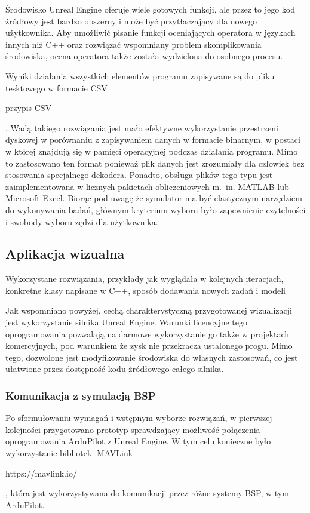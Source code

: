 Środowisko Unreal Engine oferuje wiele gotowych funkcji, ale przez to jego kod źródłowy jest bardzo obszerny i może być przytłaczający dla nowego użytkownika. Aby umożliwić pisanie funkcji oceniających operatora w językach innych niż C++ oraz rozwiązać wspomniany problem skomplikowania środowiska, ocena operatora także została wydzielona do osobnego procesu.

Wyniki działania wszystkich elementów programu zapisywane są do pliku tesktowego w formacie CSV \begin{todo}przypis CSV\end{todo}. Wadą takiego rozwiązania jest mało efektywne wykorzystanie przestrzeni dyskowej w porównaniu z zapisywaniem danych w formacie binarnym, w postaci w której znajdują się w pamięci operacyjnej podczas działania programu. Mimo to zastosowano ten format ponieważ plik danych jest zrozumiały dla człowiek bez stosowania specjalnego dekodera. Ponadto, obsługa plików tego typu jest zaimplementowana w licznych pakietach obliczeniowych m.~in. MATLAB lub Microsoft Excel. Biorąc pod uwagę że symulator ma być elastycznym narzędziem do wykonywania badań, głównym kryterium wyboru było zapewnienie czytelności i swobody wyboru zędzi dla użytkownika.

\subsection{Aplikacja wizualna}
\begin{todo}
    Wykorzystane rozwiązania, przykłady jak wyglądała w kolejnych iteracjach, konkretne klasy napisane w C++, sposób dodawania nowych zadań i modeli
\end{todo}

Jak wspomniano powyżej, cechą charakterystyczną przygotowanej wizualizacji jest wykorzystanie silnika Unreal Engine. Warunki licencyjne tego oprogramowania pozwalają na darmowe wykorzystanie go także w projektach komercyjnych, pod warunkiem że zysk nie przekracza ustalonego progu. Mimo tego, dozwolone jest modyfikowanie środowiska do własnych zastosowań, co jest ułatwione przez dostępność kodu źródłowego całego silnika.

\subsubsection{Komunikacja z symulacją BSP}

Po sformułowaniu wymagań i wstępnym wyborze rozwiązań, w pierwszej kolejności przygotowano prototyp sprawdzający możliwość połączenia oprogramowania ArduPilot z Unreal Engine. W tym celu konieczne było wykorzystanie biblioteki MAVLink \begin{todo}https://mavlink.io/\end{todo}, która jest wykorzystywana do komunikacji przez różne systemy BSP, w tym ArduPilot.


